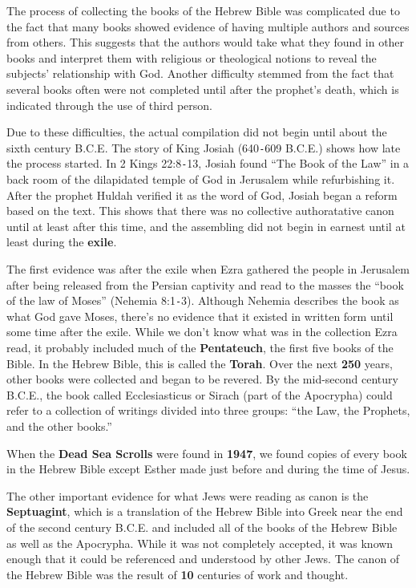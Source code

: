 \documentclass{report}
\begin{document}
        The process of collecting the books of the Hebrew Bible was complicated due to the fact that many books showed evidence of having multiple authors and sources from others. This suggests that the authors would take what they found in other books and interpret them with religious or theological notions to reveal the subjects' relationship with God. Another difficulty stemmed from the fact that several books often were not completed until after the prophet's death, which is indicated through the use of third person.

        Due to these difficulties, the actual compilation did not begin until about the sixth century B.C.E. The story of King Josiah (640\texttt{-}609 B.C.E.) shows how late the process started. In 2 Kings 22:8\texttt{-}13, Josiah found ``The Book of the Law'' in a back room of the dilapidated temple of God in Jerusalem while refurbishing it. After the prophet Huldah verified it as the word of God, Josiah began a reform based on the text. This shows that there was no collective authoratative canon until at least after this time, and the assembling did not begin in earnest until at least during the \textbf{exile}.

        The first evidence was after the exile when Ezra gathered the people in Jerusalem after being released from the Persian captivity and read to the masses the ``book of the law of Moses'' (Nehemia 8:1\texttt{-}3). Although Nehemia describes the book as what God gave Moses, there's no evidence that it existed in written form until some time after the exile. While we don't know what was in the collection Ezra read, it probably included much of the \textbf{Pentateuch}, the first five books of the Bible. In the Hebrew Bible, this is called the \textbf{Torah}. Over the next \textbf{250} years, other books were collected and began to be revered. By the mid-second century B.C.E., the book called Ecclesiasticus or Sirach (part of the Apocrypha) could refer to a collection of writings divided into three groups: ``the Law, the Prophets, and the other books.''

        When the \textbf{Dead Sea Scrolls} were found in \textbf{1947}, we found copies of every book in the Hebrew Bible except Esther made just before and during the time of Jesus.

        The other important evidence for what Jews were reading as canon is the \textbf{Septuagint}, which is a translation of the Hebrew Bible into Greek near the end of the second century B.C.E. and included all of the books of the Hebrew Bible as well as the Apocrypha. While it was not completely accepted, it was known enough that it could be referenced and understood by other Jews. The canon of the Hebrew Bible was the result of \textbf{10} centuries of work and thought.
\end{document}
